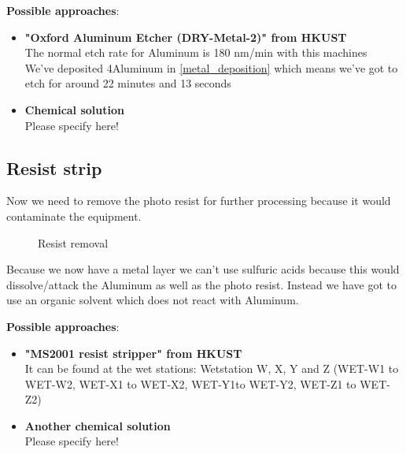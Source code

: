 \textbf{Possible approaches}:
\begin{itemize}
	\item \textbf{"Oxford Aluminum Etcher (DRY-Metal-2)" from HKUST} \\
	The normal etch rate for Aluminum is 180 nm/min with this machines \\
	We've deposited 4\um Aluminum in \autoref{metal_deposition} which means we've got to etch for around 22 minutes and 13 seconds
	\item \textbf{Chemical solution} \\
	Please specify here!
\end{itemize}

\newpage

\subsection{Resist strip}

Now we need to remove the photo resist for further processing because it would contaminate the equipment.

\begin{figure}[H]
	\centering
	\begin{tikzpicture}[node distance = 3cm, auto, thick,scale=\CrossSectionOnly, every node/.style={transform shape}]
		
	\end{tikzpicture}
	\drawStepArrow{}
	\begin{tikzpicture}[node distance = 3cm, auto, thick,scale=\CrossSectionOnly, every node/.style={transform shape}]
		
	\end{tikzpicture}
	\caption{Resist removal}
\end{figure}

Because we now have a metal layer we can't use sulfuric acids because this would dissolve/attack the Aluminum as well as the photo resist.
Instead we have got to use an organic solvent which does not react with Aluminum.

\textbf{Possible approaches}:
\begin{itemize}
	\item \textbf{"MS2001 resist stripper" from HKUST} \\
	It can be found at the wet stations: Wetstation W, X, Y and Z (WET-W1 to WET-W2, WET-X1 to WET-X2, WET-Y1to WET-Y2, WET-Z1 to WET-Z2)
	\item \textbf{Another chemical solution} \\
	Please specify here!
\end{itemize}
